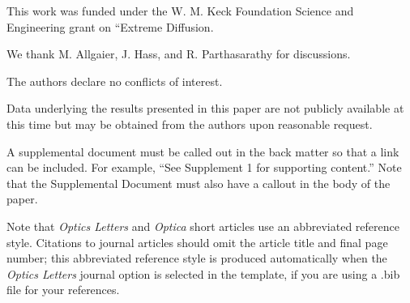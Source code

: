 \documentclass[9pt,twocolumn,twoside]{opticajnl}
\begin{document}


\begin{backmatter}
 This work was funded under the W. M. Keck Foundation Science and Engineering grant on “Extreme Diffusion.

 We thank M. Allgaier, J. Hass, and R. Parthasarathy for discussions.

 The authors declare no conflicts of interest.

 Data underlying the results presented in this paper are not publicly available at this time but may be obtained from the authors upon reasonable request.

A supplemental document must be called out in the back matter so that a link can be included. For example, “See Supplement 1 for supporting content.” Note that the Supplemental Document must also have a callout in the body of the paper.
\end{backmatter}
\bigskip
Note that \emph{Optics Letters} and \emph{Optica} short articles use an abbreviated reference style. Citations to journal articles should omit the article title and final page number; this abbreviated reference style is produced automatically when the \emph{Optics Letters} journal option is selected in the template, if you are using a .bib file for your references.



\end{document}
